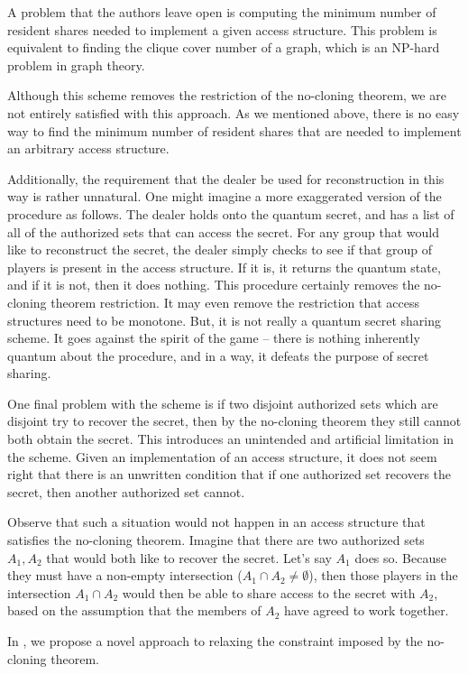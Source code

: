 A problem that the authors leave open is computing the minimum number of resident shares needed to implement a given access structure. This problem is equivalent to finding the clique cover number of a graph, which is an NP-hard problem in graph theory.

Although this scheme removes the restriction of the no-cloning theorem, we are not entirely satisfied with this approach. As we mentioned above, there is no easy way to find the minimum number of resident shares that are needed to implement an arbitrary access structure.

Additionally, the requirement that the dealer be used for reconstruction in this way is rather unnatural. One might imagine a more exaggerated version of the procedure as follows. The dealer holds onto the quantum secret, and has a list of all of the authorized sets that can access the secret. For any group that would like to reconstruct the secret, the dealer simply checks to see if that group of players is present in the access structure. If it is, it returns the quantum state, and if it is not, then it does nothing. This procedure certainly removes the no-cloning theorem restriction. It may even remove the restriction that access structures need to be monotone. But, it is not really a quantum secret sharing scheme. It goes against the spirit of the game -- there is nothing inherently quantum about the procedure, and in a way, it defeats the purpose of secret sharing.

One final problem with the scheme is if two disjoint authorized sets which are disjoint try to recover the secret, then by the no-cloning theorem they still cannot both obtain the secret. This introduces an unintended and artificial limitation in the scheme. Given an implementation of an access structure, it does not seem right that there is an unwritten condition that if one authorized set recovers the secret, then another authorized set cannot. 

Observe that such a situation would not happen in an access structure that satisfies the no-cloning theorem. Imagine that there are two authorized sets $A_1,A_2$ that would both like to recover the secret. Let's say $A_1$ does so. Because they must have a non-empty intersection ($A_1 \cap A_2 \neq \emptyset$), then those players in the intersection $A_1 \cap A_2$ would then be able to share access to the secret with $A_2$, based on the assumption that the members of $A_2$ have agreed to work together.

In , we propose a novel approach to relaxing the constraint imposed by the no-cloning theorem.